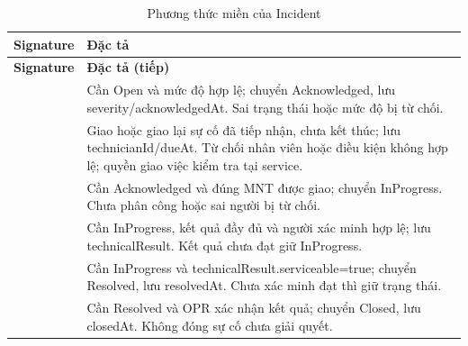 \begin{longtable}{|L{58mm}|L{81mm}|}
\caption{Phương thức miền của Incident}\\\hline
\textbf{Signature} & \textbf{Đặc tả}\\\hline
\endfirsthead
\hline\textbf{Signature} & \textbf{Đặc tả (tiếp)}\\\hline\endhead
{} &
Cần Open và mức độ hợp lệ; chuyển Acknowledged, lưu severity/acknowledgedAt. Sai trạng thái hoặc mức độ bị từ chối.\\\hline
{} &
Giao hoặc giao lại sự cố đã tiếp nhận, chưa kết thúc; lưu technicianId/dueAt. Từ chối nhân viên hoặc điều kiện không hợp lệ; quyền giao việc kiểm tra tại service.\\\hline
{} &
Cần Acknowledged và đúng MNT được giao; chuyển InProgress. Chưa phân công hoặc sai người bị từ chối.\\\hline
{} &
Cần InProgress, kết quả đầy đủ và người xác minh hợp lệ; lưu technicalResult. Kết quả chưa đạt giữ InProgress.\\\hline
{} &
Cần InProgress và technicalResult.serviceable=true; chuyển Resolved, lưu resolvedAt. Chưa xác minh đạt thì giữ trạng thái.\\\hline
{} &
Cần Resolved và OPR xác nhận kết quả; chuyển Closed, lưu closedAt. Không đóng sự cố chưa giải quyết.\\\hline
\end{longtable}

